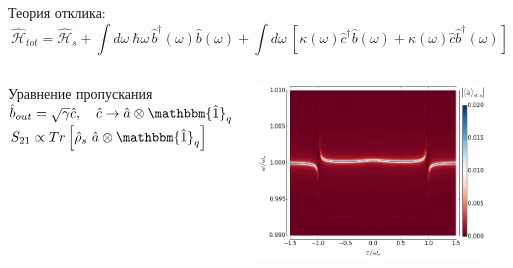 \documentclass[aspectratio=169, 13pt]{beamer}
\begin{document}
\begin{frame}[c]\frametitle{\secname}\framesubtitle{\subsecname}
Теория отклика:
\centering
\begin{equation*}
\mathcal{\hat H}_{tot} = \mathcal{\hat H}_{s} +\int d\omega\ \hbar \omega\, \hat b^\dag(\omega) \hat b(\omega) + \int d\omega\ [ \kappa(\omega) \hat c^{\dag} \hat b(\omega) + \kappa(\omega)\hat c \hat b^{\dag}(\omega)]
\end{equation*}

\begin{columns}[c]
\begin{block}{Уравнение пропускания}
\centering
$\hat b_{out}= \sqrt{\gamma} \hat c,\quad \hat c \rightarrow \hat a \otimes \mathbbm{\hat 1}_q$\\

\vspace{.5cm}
$S_{21} \propto Tr\left[\hat \rho_s\ \hat a \otimes \mathbbm{\hat 1}_q\right]$
\end{block}
\includegraphics[width=0.9\textwidth]{Rabi_anticrossing_far_dyn}
\end{columns}
\end{frame}
\fi
\end{document}
